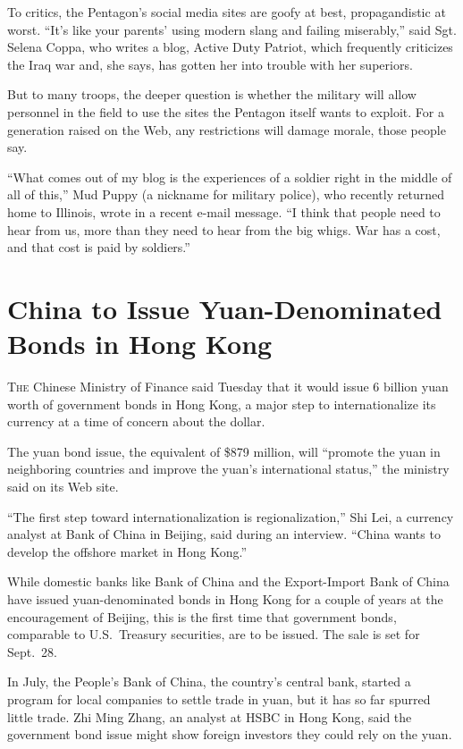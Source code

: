 ﻿\documentclass[12pt]{article}
\begin{document}
To critics, the Pentagon's social media sites are goofy at best, propagandistic at worst. ``It's
like your parents' using modern slang and failing miserably,'' said Sgt. Selena Coppa, who writes a
blog, Active Duty Patriot, which frequently criticizes the Iraq war and, she says, has gotten her
into trouble with her superiors.

But to many troops, the deeper question is whether the military will allow personnel in the field to
use the sites the Pentagon itself wants to exploit. For a generation raised on the Web, any
restrictions will damage morale, those people say.

``What comes out of my blog is the experiences of a soldier right in the middle of all of this,''
Mud Puppy (a nickname for military police), who recently returned home to Illinois, wrote in a
recent e-mail message. ``I think that people need to hear from us, more than they need to hear from
the big whigs. War has a cost, and that cost is paid by soldiers.''

\section{China to Issue Yuan-Denominated Bonds in Hong Kong}

\lettrine{T}{he} Chinese Ministry of Finance said Tuesday that it would issue 6 billion yuan worth
of government bonds in Hong Kong, a major step to internationalize its currency at a time of concern
about the dollar.

The yuan bond issue, the equivalent of \$879 million, will ``promote the yuan in neighboring
countries and improve the yuan's international status,'' the ministry said on its Web site.

``The first step toward internationalization is regionalization,'' Shi Lei, a currency analyst at
Bank of China in Beijing, said during an interview. ``China wants to develop the offshore market in
Hong Kong.''

While domestic banks like Bank of China and the Export-Import Bank of China have issued
yuan-denominated bonds in Hong Kong for a couple of years at the encouragement of Beijing, this is
the first time that government bonds, comparable to U.S.~Treasury securities, are to be issued. The
sale is set for Sept.~28.

In July, the People's Bank of China, the country's central bank, started a program for local
companies to settle trade in yuan, but it has so far spurred little trade. Zhi Ming Zhang, an
analyst at HSBC in Hong Kong, said the government bond issue might show foreign investors they could
rely on the yuan.
\end{document}
